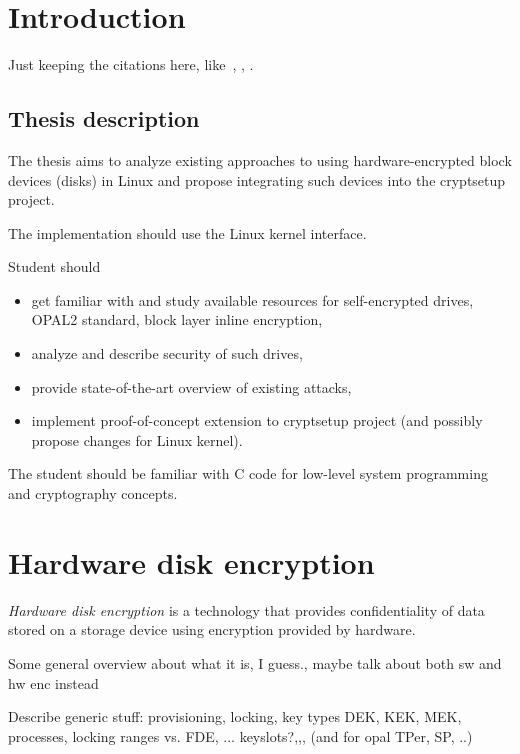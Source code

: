 \documentclass[
  digital, %
  oneside, %
  nolof,     %
  nolot,     %
]{fithesis4}
\begin{document}
\chapter{Introduction}

Just keeping the citations here, like~\cite{tcg-opal2}, \cite{linux-doc-inline}, \cite{sed-vulnerabilities}.

\section{Thesis description}


 The thesis aims to analyze existing approaches to using hardware-encrypted block devices (disks) in Linux and propose integrating such devices into the cryptsetup project.

The implementation should use the Linux kernel interface.

Student should
\begin{itemize}
    \item get familiar with and study available resources for self-encrypted drives, OPAL2 standard, block layer inline encryption,
    \item analyze and describe security of such drives,
    \item provide state-of-the-art overview of existing attacks,
    \item implement proof-of-concept extension to cryptsetup project (and possibly propose changes for Linux kernel).
\end{itemize}

The student should be familiar with C code for low-level system programming and cryptography concepts. 

\chapter{Hardware disk encryption}

\emph{Hardware disk encryption} is a technology that provides confidentiality of data stored on a storage device using encryption provided by hardware.

Some general overview about what it is, I guess., maybe talk about both sw and hw enc instead

Describe generic stuff: provisioning, locking, key types DEK, KEK, MEK, processes, locking ranges vs. FDE, ... keyslots?,,, (and for opal TPer, SP, ..)
\end{document}
